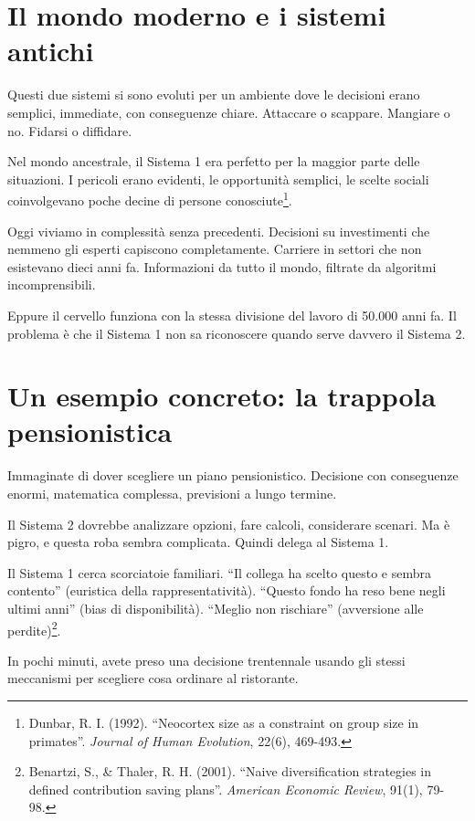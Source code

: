 \section{Il mondo moderno e i sistemi antichi}

Questi due sistemi si sono evoluti per un ambiente dove le decisioni erano semplici, immediate, con conseguenze chiare. Attaccare o scappare. Mangiare o no. Fidarsi o diffidare.

Nel mondo ancestrale, il Sistema 1 era perfetto per la maggior parte delle situazioni. I pericoli erano evidenti, le opportunità semplici, le scelte sociali coinvolgevano poche decine di persone conosciute\footnote{Dunbar, R. I. (1992). ``Neocortex size as a constraint on group size in primates''. \textit{Journal of Human Evolution}, 22(6), 469-493.}.

Oggi viviamo in complessità senza precedenti. Decisioni su investimenti che nemmeno gli esperti capiscono completamente. Carriere in settori che non esistevano dieci anni fa. Informazioni da tutto il mondo, filtrate da algoritmi incomprensibili.

Eppure il cervello funziona con la stessa divisione del lavoro di 50.000 anni fa. Il problema è che il Sistema 1 non sa riconoscere quando serve davvero il Sistema 2.

\section{Un esempio concreto: la trappola pensionistica}

Immaginate di dover scegliere un piano pensionistico. Decisione con conseguenze enormi, matematica complessa, previsioni a lungo termine.

Il Sistema 2 dovrebbe analizzare opzioni, fare calcoli, considerare scenari. Ma è pigro, e questa roba sembra complicata. Quindi delega al Sistema 1.

Il Sistema 1 cerca scorciatoie familiari. ``Il collega ha scelto questo e sembra contento'' (euristica della rappresentatività). ``Questo fondo ha reso bene negli ultimi anni'' (bias di disponibilità). ``Meglio non rischiare'' (avversione alle perdite)\footnote{Benartzi, S., \& Thaler, R. H. (2001). ``Naive diversification strategies in defined contribution saving plans''. \textit{American Economic Review}, 91(1), 79-98.}.

In pochi minuti, avete preso una decisione trentennale usando gli stessi meccanismi per scegliere cosa ordinare al ristorante.


